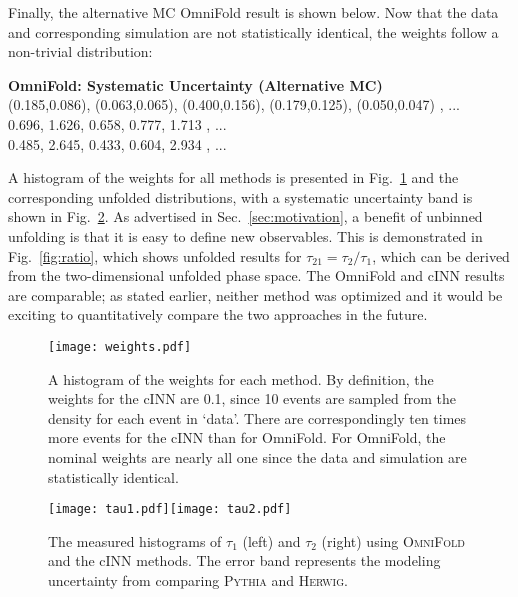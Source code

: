 \documentclass[a4paper,11pt]{article}
\begin{document}
  \vspace{2mm}
 
\noindent Finally, the alternative MC OmniFold result is shown below.  Now that the data and corresponding simulation are not statistically identical, the weights follow a non-trivial distribution:
 
 \vspace{5mm}
 
  \begin{tcolorbox}
 \textbf{OmniFold: Systematic Uncertainty (Alternative MC)}\\
(0.185,0.086), (0.063,0.065), (0.400,0.156), (0.179,0.125), (0.050,0.047) , ... \\
0.696, 1.626, 0.658, 0.777, 1.713 , ... \\
0.485, 2.645, 0.433, 0.604, 2.934 , ...
 \end{tcolorbox}

  \vspace{2mm}
  
  A histogram of the weights for all methods is presented in Fig.~\ref{fig:weights} and the corresponding unfolded distributions, with a systematic uncertainty band is shown in Fig.~\ref{fig:dists}.  As advertised in Sec.~\ref{sec:motivation}, a benefit of unbinned unfolding is that it is easy to define new observables.  This is demonstrated in Fig.~\ref{fig:ratio}, which shows unfolded results for $\tau_{21}=\tau_2/\tau_1$, which can be derived from the two-dimensional unfolded phase space.  The OmniFold and cINN results are comparable; as stated earlier, neither method was optimized and it would be exciting to quantitatively compare the two approaches in the future.

\begin{figure}[h!]
\centering
\texttt{[image: weights.pdf]}
  \caption{A histogram of the weights for each method.  By definition, the weights for the cINN are 0.1, since 10 events are sampled from the density for each event in `data'.  There are correspondingly ten times more events for the cINN than for OmniFold.  For OmniFold, the nominal weights are nearly all one since the data and simulation are statistically identical.}
    \label{fig:weights}
\end{figure}


\begin{figure}[h!]
\centering
\texttt{[image: tau1.pdf]}\texttt{[image: tau2.pdf]}
  \caption{The measured histograms of $\tau_1$ (left) and $\tau_2$ (right) using \textsc{OmniFold} and the cINN methods.  The error band represents the modeling uncertainty from comparing \textsc{Pythia} and \textsc{Herwig}.}
    \label{fig:dists}
\end{figure}
\end{document}
